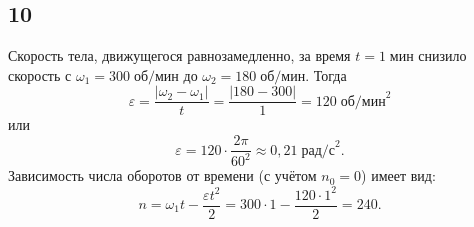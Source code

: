 \subsection{10}

Скорость тела, движущегося равнозамедленно, за время $t=1\;\text{мин}$ снизило скорость с $\omega_1=300\;\text{об/мин}$ до $\omega_2=180\;\text{об/мин}$. Тогда
\[
\varepsilon=\frac{|\omega_2-\omega_1|}{t}=\frac{|180-300|}{1}=120\;\text{об/мин}^2
\]
или
\[
\varepsilon=120\cdot\frac{2\pi}{60^2}\approx0{,}21\;\text{рад/с}^2.
\]
Зависимость числа оборотов от времени (с учётом $n_0=0$) имеет вид:
\[
n=\omega_1t-\frac{\varepsilon t^2}{2}=300\cdot1-\frac{120\cdot1^2}{2}=240.
\]